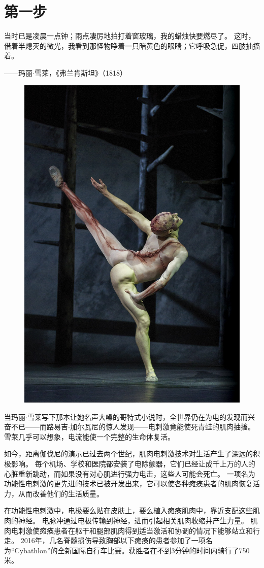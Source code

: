 

\chapter{第一步} \label{chap:chap1}

当时已是凌晨一点钟；雨点凄厉地拍打着窗玻璃，我的蜡烛快要燃尽了。
这时，借着半熄灭的微光，我看到那怪物睁着一只暗黄色的眼睛；它呼吸急促，四肢抽搐着。

\begin{flushright}
	——玛丽$\cdot$雪莱，《弗兰肯斯坦》（1818）\\
\end{flushright}


\begin{figure}[!htb]
	\centering
	\includegraphics[width=0.5\linewidth]{chap1/1_0}
	\caption*{ \label{fig:1_0}}
\end{figure}

当玛丽$\cdot$雪莱写下那本让她名声大噪的哥特式小说时，全世界仍在为电的发现而兴奋不已——而路易吉$\cdot$加尔瓦尼的惊人发现——电刺激竟能使死青蛙的肌肉抽搐。
雪莱几乎可以想象，电流能使一个完整的生命体复活。


如今，距离伽伐尼的演示已过去两个世纪，肌肉电刺激技术对生活产生了深远的积极影响。
每个机场、学校和医院都安装了电除颤器，它们已经让成千上万的人的心脏重新跳动，而如果没有对心肌进行强力电击，这些人可能会死亡。
一项名为功能性电刺激的更先进的技术已被开发出来，它可以使各种瘫痪患者的肌肉恢复活力，从而改善他们的生活质量。


在功能性电刺激中，电极要么贴在皮肤上，要么植入瘫痪肌肉中，靠近支配这些肌肉的神经。
电脉冲通过电极传输到神经，进而引起相关肌肉收缩并产生力量。
肌肉电刺激使瘫痪患者在躯干和腿部肌肉得到适当激活和协调的情况下能够站立和行走。
2016年，几名脊髓损伤导致胸部以下瘫痪的患者参加了一项名为“Cybathlon”的全新国际自行车比赛。获胜者在不到3分钟的时间内骑行了750米。


